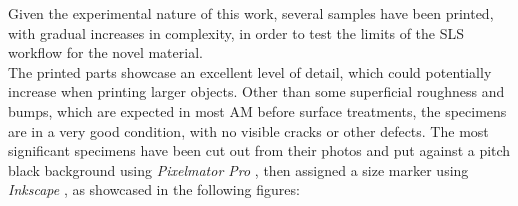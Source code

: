 \documentclass{article}
\begin{document}
        Given the experimental nature of this work, several samples have been printed, with gradual 
        increases in complexity, in order to test the limits of the SLS workflow for the novel material. \\ 

        
        The printed parts showcase an excellent level of detail, which could potentially increase when printing larger objects. 
        Other than some superficial roughness and bumps, which are expected
        in most AM before surface treatments, the specimens are in a very good condition, with no visible cracks or other defects.
        The most significant specimens have been cut out from their photos and put against a pitch black background
        using \textit{Pixelmator Pro} \autocites{Pixelmator_Pro}, then assigned a size marker using \textit{Inkscape}
        \autocites{Inkscape}, as showcased in the following figures: 

\end{document}
